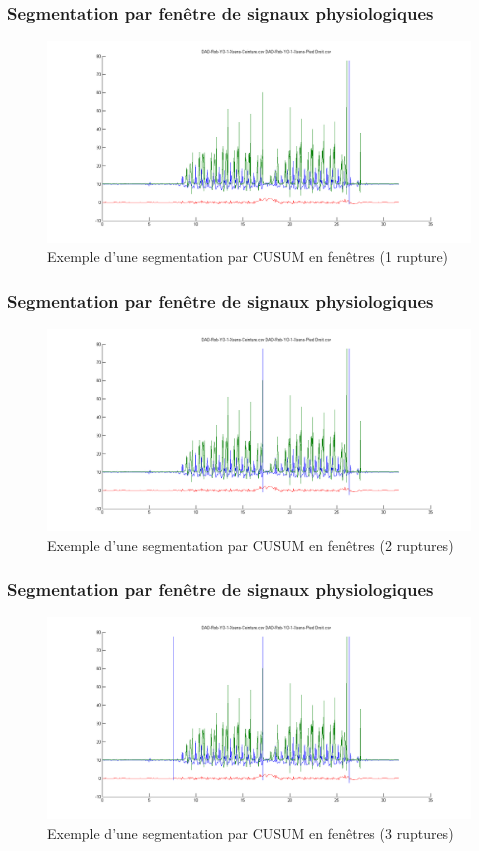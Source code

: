 \documentclass{beamer}
\begin{document}
\begin{frame}
	\frametitle{Segmentation par fenêtre de signaux physiologiques}
	\begin{figure}
		\includegraphics[scale=0.3]{seg1_win.png}
		\caption{Exemple d'une segmentation par CUSUM en fenêtres (1 rupture)}
	\end{figure}
\end{frame}

\begin{frame}
	\frametitle{Segmentation par fenêtre de signaux physiologiques}
	\begin{figure}
		\includegraphics[scale=0.3]{seg2_win.png}
		\caption{Exemple d'une segmentation par CUSUM en fenêtres (2 ruptures)}
	\end{figure}
\end{frame}

\begin{frame}
	\frametitle{Segmentation par fenêtre de signaux physiologiques}
	\begin{figure}
		\includegraphics[scale=0.3]{seg3_win.png}
		\caption{Exemple d'une segmentation par CUSUM en fenêtres (3 ruptures)}
	\end{figure}
\end{frame}
\end{document}
